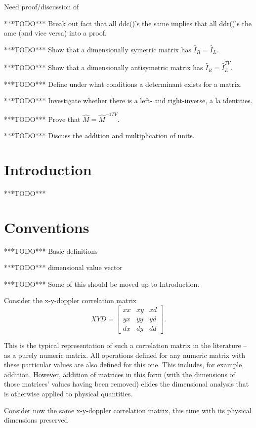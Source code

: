 \documentclass[10pt,letterpaper]{article}
\author{T. Zachary Laine}
\numberwithin{equation}{section}
\begin{document}
Need proof/discussion of

***TODO*** Break out fact that all ddc()'s the same implies that all
ddr()'s the ame (and vice versa) into a proof.

***TODO*** Show that a dimensionally symetric matrix has $\hat I_R = \hat I_L$.

***TODO*** Show that a dimensionally antisymetric matrix has $\hat I_R =
\hat I_L^{TV}$.

***TODO*** Define under what conditions a determinant exists for a matrix.

***TODO*** Investigate whether there is a left- and right-inverse, a
la identities.

***TODO*** Prove that $\hat M = \hat M^{-1TV}$.

***TODO*** Discuss the addition and multiplication of units.

\section{Introduction}

***TODO***

\section{Conventions}

***TODO*** Basic definitions

***TODO*** dimensional value vector

***TODO*** Some of this should be moved up to Introduction.

Consider the x-y-doppler correlation matrix
\[XYD = \left[ \begin{matrix}
xx & xy & xd \\ yx & yy & yd \\ dx & dy & dd
\end{matrix} \right]. \]

This is the typical representation of such a correlation matrix in the
literature – as a purely numeric matrix.  All operations defined for
any numeric matrix with these particular values are also defined for
this one.  This includes, for example, addition.  However, addition of
matrices in this form (with the dimensions of those matrices' values
having been removed) elides the dimensional analysis that is otherwise
applied to physical quantities.

Consider now the same x-y-doppler correlation matrix, this time with
its physical dimensions preserved
\end{document}
